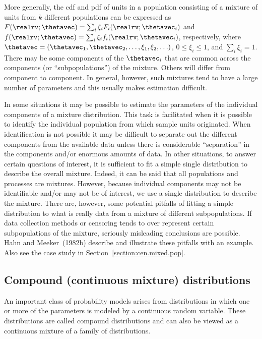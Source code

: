 More generally, the cdf and pdf of units in a population
consisting of a mixture of units from $k$ different populations can be
expressed as $F(\realrv;\thetavec)=
\sum_{i} \xi_{i} F_{i}(\realrv;\thetavec_{i})$
and $f(\realrv;\thetavec)=
\sum_{i} \xi_{i} f_{i}(\realrv;\thetavec_{i})$, respectively,
where $\thetavec=(\thetavec_{1},\thetavec_{2},\ldots,\xi_{1}, \xi_{2},
\ldots)$, $0 \leq \xi_{i} \leq 1$, and $\sum_{i} \xi_{i}=1$. There
may be some components of the $\thetavec_{i}$ that are common across
the components (or ``subpopulations'') of the mixture. Others will
differ from component to component. In general, however, such
mixtures tend to have a large number of parameters and this usually
makes estimation difficult.

In some situations it may be possible to estimate the parameters of
the individual components of a mixture distribution. This task is
facilitated when it is possible to identify the individual population
from which sample units originated. When identification is not
possible it may be difficult to separate out the different components
from the available data unless there is considerable ``separation'' in
the components and/or enormous amounts of data.  In other situations,
to answer certain questions of interest, it is sufficient to fit a
simple single distribution to describe the overall mixture. Indeed, it
can be said that all populations and processes are mixtures. However,
because individual components may not be identifiable and/or may not
be of interest, we use a single distribution to describe the mixture.
There are, however, some potential pitfalls of fitting a simple
distribution to what is really data from a mixture of different
subpopulations. If data collection methods or censoring tends to over
represent certain subpopulations of the mixture, seriously misleading
conclusions are possible.  Hahn and Meeker~(1982b) describe and
illustrate these pitfalls with an example.  Also see the case study in
Section~\ref{section:cen.mixed.pop}.
\subsection{Compound (continuous mixture) distributions}
\label{section:continuous.mixtures}
An important class of probability models arises from distributions in
which one or more of the parameters is modeled by a continuous
random variable. These distributions are called compound distributions
and can also be viewed as a continuous mixture of a family of
distributions.  

